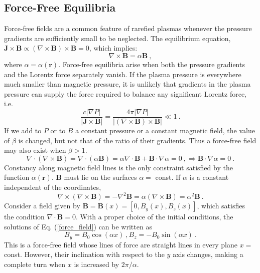 \documentclass[12pt,a4paper]{article}
\renewcommand{\vec}[1]{\boldsymbol{#1}}
\begin{document}
\subsection{Force-Free Equilibria}
Force-free fields are a common feature of rarefied plasmas whenever the pressure gradients are sufficiently small to be neglected. The equilibrium equation, $\vec{J} \times  \vec{B} \propto (\nabla \times \vec{B}) \times \vec{B} = 0$, which implies:
\begin{equation}
\nabla \times \vec{B} = \alpha \vec{B} ~,
\end{equation}
where $\alpha = \alpha(\vec{r})$. Force-free equilibria arise when both the pressure gradients and the Lorentz force separately vanish. If the plasma pressure is everywhere much smaller than magnetic pressure, it is unlikely that gradients in the plasma pressure can supply the force required to balance any significant Lorentz force, i.e.
\begin{equation*}
\dfrac{c|\nabla P|}{|\vec{J} \times \vec{B}|} = \dfrac{4\pi |\nabla P|}{|(\nabla \times \vec{B}) \times \vec{B}|} \ll 1 ~.
\end{equation*}
If we add to $P$ or to $B$ a constant pressure or a constant magnetic field, the value of $\beta$ is changed, but not that of the ratio of their gradients. Thus a force-free field may also exist when $\beta > 1$.
\begin{equation*}
\nabla \cdot (\nabla \times \vec{B}) = \nabla \cdot (\alpha \vec{B}) = \alpha \nabla \cdot \vec{B} +\vec{B}\cdot \nabla \alpha = 0 ~, \Longrightarrow \vec{B}\cdot \nabla \alpha = 0 ~.
\end{equation*}
Constancy along magnetic field lines is the only constraint satisfied by the function $\alpha(\vec{r})$. $\vec{B}$ must lie on the surfaces $\alpha =$ const. If $\alpha$ is a constant independent of the coordinates,
\begin{equation}
\nabla \times (\nabla \times \vec{B}) = -\nabla^2 \vec{B} = \alpha (\nabla \times \vec{B}) = \alpha^2 \vec{B} ~.
\label{force_field}
\end{equation}
Consider a field given by $\vec{B} = \vec{B}(x) = [0, B_y(x), B_z(x)]$, which satisfies the condition $\nabla \cdot \vec{B} = 0$. With a proper choice of the initial conditions, the solutions of Eq. (\ref{force_field}) can be written as
\begin{equation}
B_y = B_0 \cos (\alpha x) ~, B_z = -B_0 \sin(\alpha x) ~.
\end{equation}
This is a force-free field whose lines of force are straight lines in every plane $x =$ const. However, their inclination with respect to the $y$ axis changes, making a complete turn when $x$ is increased by $2\pi/\alpha$.
\end{document}
